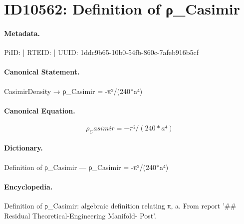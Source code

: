 \section*{ID10562: Definition of ρ\_Casimir}
\paragraph{Metadata.}
PiID:  | RTEID:  | UUID: 1ddc9b65-10b0-54fb-860c-7afeb916b5cf

\paragraph{Canonical Statement.}
CasimirDensity → ρ\_Casimir = -π²/(240*a⁴)

\paragraph{Canonical Equation.}
\[
ρ_Casimir = -π²/(240*a⁴)
\]

\paragraph{Dictionary.}
Definition of ρ\_Casimir — ρ\_Casimir = -π²/(240*a⁴)

\paragraph{Encyclopedia.}
Definition of ρ\_Casimir: algebraic definition relating π, a. From report '\#\# Residual Theoretical-Engineering Manifold- Post'.
